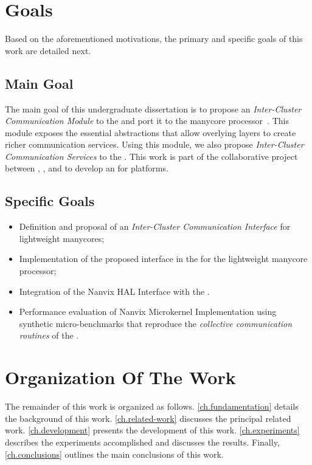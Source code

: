 \section{Goals}
\label{sec.goals}

	Based on the aforementioned motivations, the primary and specific
	goals of this work are detailed next.

\subsection{Main Goal}
\label{sec.goals.main}

	The main goal of this undergraduate dissertation is to propose an
	\textit{Inter-Cluster Communication Module} to the \nanvix
	\textit{\hal} and port it to the \mppa manycore
	processor~\cite{DeDinechin2013-1}. This module exposes the
	essential abstractions that allow overlying layers to create richer
	communication services. Using this module, we also
	propose \textit{Inter-Cluster Communication Services} to the \nanvix
	\microkernel. This work is part of the collaborative project between
	\ufsc, \pucminas, and \uga to develop an \os for \lightweight \manycore platforms.

\subsection{Specific Goals}
\label{sec.goals.specific}

	\begin{itemize}
		\item Definition and proposal of an \textit{Inter-Cluster Communication Interface} for lightweight manycores;

		\item Implementation of the proposed interface in the \nanvix \hal for the \mppa lightweight manycore processor;
        
		\item Integration of the Nanvix HAL Interface with the \nanvix \microkernel.
		
		\item Performance evaluation of Nanvix Microkernel Implementation using synthetic micro-benchmarks that reproduce the \textit{collective communication routines} of the \mpi.
	\end{itemize}

\section{Organization Of The Work}
\label{sec.organization}
	
	The remainder of this work is organized as follows.
	\autoref{ch.fundamentation} details the background of this work.
	\autoref{ch.related-work} discusses the principal related work.
	\autoref{ch.development} presents the development of this work.
	\autoref{ch.experiments} describes the experiments accomplished and
	discusses the results. Finally, \autoref{ch.conclusions} outlines
	the main conclusions of this work.
